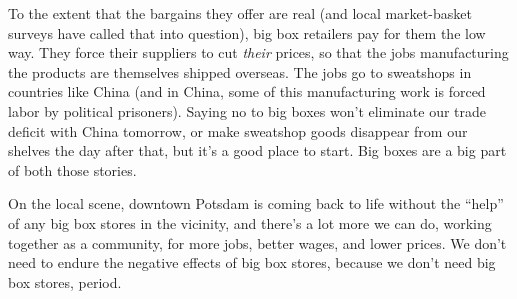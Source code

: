 
\vspace{6.5pt}

To the extent that the bargains they offer are real (and local market-basket surveys have called that into question), big box retailers pay for them the low way.  They force their suppliers to cut {\em their} prices, so that the jobs manufacturing the products are themselves shipped overseas.  The jobs go to sweatshops in countries like China (and in China, some of this manufacturing work is forced labor by political prisoners).  Saying no to big boxes won't eliminate our trade deficit with China tomorrow, or make sweatshop goods disappear from our shelves the day after that, but it's a good place to start.  Big boxes are a big part of both those stories.

\vspace{7pt}

On the local scene, downtown Potsdam is coming back to life without the ``help'' of any big box stores in the vicinity, and there's a lot more we can do, working together as a community, for more jobs, better wages, and lower prices.  We don't need to endure the negative effects of big box stores, because we don't need big box stores, period.
